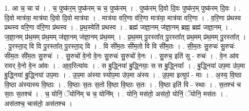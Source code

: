 \documentclass[17pt]{extarticle}
\begin{document}
1. आ च॒ चा च॑ । . च॒ पुष्क॑र॒म् पुष्क॑रम् च च॒ पुष्क॑रम् । . पुष्क॑रम् दि॒वो दि॒वः पुष्क॑र॒म् पुष्क॑रम् दि॒वः । . दि॒वो मात्र॑या॒ मात्र॑या दि॒वो दि॒वो मात्र॑या । . मात्र॑या वरि॒णा व॑रि॒णा मात्र॑या॒ मात्र॑या वरि॒णा । . व॒रि॒णा प्र॑थस्व प्रथस्व वरि॒णा व॑रि॒णा प्र॑थस्व । . प्र॒थ॒स्वेति॑ प्रथस्व । . ब्रह्म॑ जज्ञा॒नम् ज॑ज्ञा॒नम् ब्रह्म॒ ब्रह्म॑ जज्ञा॒नम् । . ज॒ज्ञा॒नम् प्र॑थ॒मम् प्र॑थ॒मम् ज॑ज्ञा॒नम् ज॑ज्ञा॒नम् प्र॑थ॒मम् । . प्र॒थ॒मम् पु॒रस्ता᳚त् पु॒रस्ता᳚त् प्रथ॒मम् प्र॑थ॒मम् पु॒रस्ता᳚त् । . पु॒रस्ता॒द् वि वि पु॒रस्ता᳚त् पु॒रस्ता॒द् वि । . वि सी॑म॒तः सी॑म॒तो वि वि सी॑म॒तः । . सी॒म॒तः सु॒रुचः॑ सु॒रुचः॑ सीम॒तः सी॑म॒तः सु॒रुचः॑ । . सु॒रुचो॑ वे॒नो वे॒नः सु॒रुचः॑ सु॒रुचो॑ वे॒नः । . सु॒रुच॒ इति॑ सु - रुचः॑ । . वे॒न आ॑व रावर् वे॒नो वे॒न आ॑वः । . आ॒व॒रित्या॑वः । . स बु॒द्ध्निया॑ बु॒द्ध्नियाः॒ स स बु॒द्ध्नियाः᳚ । . बु॒द्ध्निया॑ उप॒मा उ॑प॒मा बु॒द्ध्निया॑ बु॒द्ध्निया॑ उप॒माः । . उ॒प॒मा अ॑स्या स्योप॒मा उ॑प॒मा अ॑स्य । . उ॒प॒मा इत्युप॑ - माः । . अ॒स्य॒ वि॒ष्ठा वि॒ष्ठा अ॑स्यास्य वि॒ष्ठाः । . वि॒ष्ठाः स॒तः स॒तो वि॒ष्ठा वि॒ष्ठाः स॒तः । . वि॒ष्ठा इति॑ वि - स्थाः । . स॒तश्च॑ च स॒तः स॒तश्च॑ । . च॒ योनिं॒ ॅयोनि॑म् च च॒ योनि᳚म् । . योनि॒ मस॑तो॒ अस॑तो॒ योनिं॒ ॅयोनि॒ मस॑तः । . अस॑तश्च॒ चास॑तो॒ अस॑तश्च । \newline
\end{document}
